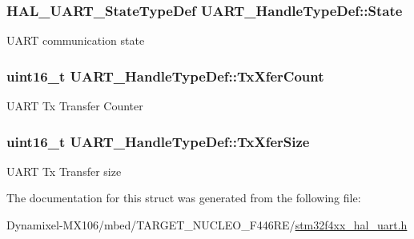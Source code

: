 \subsubsection[{\texorpdfstring{State}{State}}]{ {\bf H\+A\+L\+\_\+\+U\+A\+R\+T\+\_\+\+State\+Type\+Def} U\+A\+R\+T\+\_\+\+Handle\+Type\+Def\+::\+State}\hypertarget{struct_u_a_r_t___handle_type_def_a61f2d1d0228c38b6e1e32eed80dbf0c8}{}\label{struct_u_a_r_t___handle_type_def_a61f2d1d0228c38b6e1e32eed80dbf0c8}
U\+A\+RT communication state 
\subsubsection[{\texorpdfstring{Tx\+Xfer\+Count}{TxXferCount}}]{\setlength{\rightskip}{0pt plus 5cm}uint16\+\_\+t U\+A\+R\+T\+\_\+\+Handle\+Type\+Def\+::\+Tx\+Xfer\+Count}\hypertarget{struct_u_a_r_t___handle_type_def_a874ef209c0571231b2e4b951007eefac}{}\label{struct_u_a_r_t___handle_type_def_a874ef209c0571231b2e4b951007eefac}
U\+A\+RT Tx Transfer Counter 
\subsubsection[{\texorpdfstring{Tx\+Xfer\+Size}{TxXferSize}}]{\setlength{\rightskip}{0pt plus 5cm}uint16\+\_\+t U\+A\+R\+T\+\_\+\+Handle\+Type\+Def\+::\+Tx\+Xfer\+Size}\hypertarget{struct_u_a_r_t___handle_type_def_a98e2ea90caba72ac0cd5b1815a5ccb81}{}\label{struct_u_a_r_t___handle_type_def_a98e2ea90caba72ac0cd5b1815a5ccb81}
U\+A\+RT Tx Transfer size 

The documentation for this struct was generated from the following file\+:\begin{DoxyCompactItemize}
\item 
Dynamixel-\/\+M\+X106/mbed/\+T\+A\+R\+G\+E\+T\+\_\+\+N\+U\+C\+L\+E\+O\+\_\+\+F446\+R\+E/\hyperlink{stm32f4xx__hal__uart_8h}{stm32f4xx\+\_\+hal\+\_\+uart.\+h}\end{DoxyCompactItemize}
